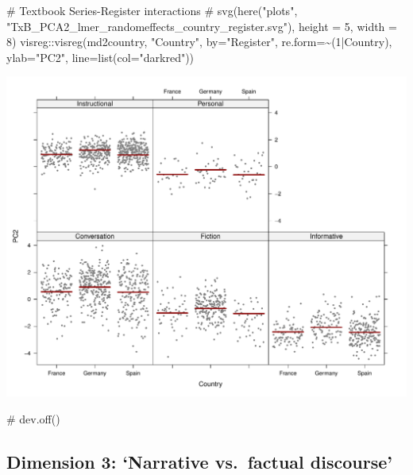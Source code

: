 \documentclass[
  letterpaper,
  DIV=11,
  numbers=noendperiod]{scrreprt}
\newenvironment{Shaded}{\begin{snugshade}}{\end{snugshade}}
\newcommand{\AttributeTok}[1]{\textcolor[rgb]{0.40,0.45,0.13}{#1}}
\newcommand{\CommentTok}[1]{\textcolor[rgb]{0.37,0.37,0.37}{#1}}
\newcommand{\DecValTok}[1]{\textcolor[rgb]{0.68,0.00,0.00}{#1}}
\newcommand{\FunctionTok}[1]{\textcolor[rgb]{0.28,0.35,0.67}{#1}}
\newcommand{\NormalTok}[1]{\textcolor[rgb]{0.00,0.23,0.31}{#1}}
\newcommand{\SpecialCharTok}[1]{\textcolor[rgb]{0.37,0.37,0.37}{#1}}
\newcommand{\StringTok}[1]{\textcolor[rgb]{0.13,0.47,0.30}{#1}}
\begin{document}
\begin{Shaded}
\begin{Highlighting}[]
\CommentTok{\# Textbook Series{-}Register interactions}
\CommentTok{\# svg(here("plots", "TxB\_PCA2\_lmer\_randomeffects\_country\_register.svg"), height = 5, width = 8)}
\NormalTok{visreg}\SpecialCharTok{::}\FunctionTok{visreg}\NormalTok{(md2country, }\StringTok{"Country"}\NormalTok{, }\AttributeTok{by=}\StringTok{"Register"}\NormalTok{, }\AttributeTok{re.form=}\SpecialCharTok{\textasciitilde{}}\NormalTok{(}\DecValTok{1}\SpecialCharTok{|}\NormalTok{Country),}
               \AttributeTok{ylab=}\StringTok{"PC2"}\NormalTok{, }\AttributeTok{line=}\FunctionTok{list}\NormalTok{(}\AttributeTok{col=}\StringTok{"darkred"}\NormalTok{))}
\end{Highlighting}
\end{Shaded}

\includegraphics{E_Ch6_Analysis_files/figure-pdf/Dim2estimateplots-4.pdf}

\begin{Shaded}
\begin{Highlighting}[]
\CommentTok{\# dev.off()}
\end{Highlighting}
\end{Shaded}

\subsection{Dimension 3: `Narrative vs.~factual
discourse'}\label{dimension-3-narrative-vs.-factual-discourse}
\end{document}
